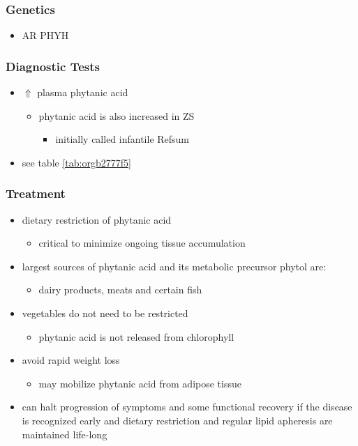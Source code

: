 \documentclass[12pt]{scrartcl}
\begin{document}
\subsubsection{Genetics}
\label{sec:orgf38902a}
\begin{itemize}
\item AR PHYH
\end{itemize}

\subsubsection{Diagnostic Tests}
\label{sec:org159bd05}
\begin{itemize}
\item \(\Uparrow\) plasma phytanic acid 
\begin{itemize}
\item phytanic acid is also increased in ZS
\begin{itemize}
\item initially called infantile Refsum
\end{itemize}
\end{itemize}
\item see table \ref{tab:orgb2777f5}
\end{itemize}
\subsubsection{Treatment}
\label{sec:orgba68d4f}
\begin{itemize}
\item dietary restriction of phytanic acid 
\begin{itemize}
\item critical to minimize ongoing tissue accumulation
\end{itemize}
\item largest sources of phytanic acid and its metabolic precursor phytol are:
\begin{itemize}
\item dairy products, meats and certain fish
\end{itemize}
\item vegetables do not need to be restricted
\begin{itemize}
\item phytanic acid is not released from chlorophyll
\end{itemize}
\item avoid rapid weight loss
\begin{itemize}
\item may mobilize phytanic acid from adipose tissue
\end{itemize}
\item can halt progression of symptoms and some functional recovery if the
disease is recognized early and dietary restriction and regular
lipid apheresis are maintained life-long
\end{itemize}
\end{document}
